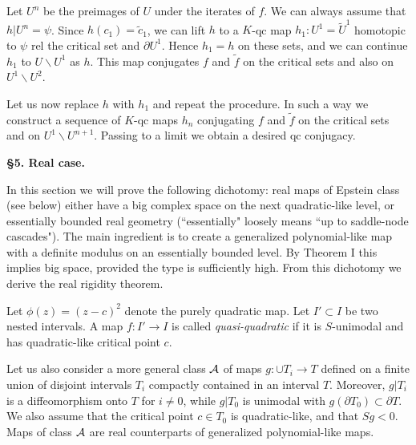 Let $U^n$ be the preimages of $U$ under the iterates of $f$. 
We can always assume 
that $h|U^n=\psi$.  Since $h(c_1)=\tilde c_1$, we can lift $h$ to a $K$-qc map
$h_1: U^1=\tilde U^1$ homotopic to $\psi$ rel the critical set and
$\partial U^1$. Hence $h_1=h$ on these sets, and we can continue $h_1$ to
$U\backslash U^1$ as $h$. This map conjugates $f$ and $\tilde f$ on 
the critical sets and also on $U^1\backslash U^2$.

Let us now replace $h$ with $h_1$ and repeat the procedure. In such a way
we construct a sequence of $K$-qc maps $h_n$ conjugating $f$ and $\tilde f$
on the critical sets and on $U^1\backslash U^{n+1}$. 
Passing to a limit we obtain a desired qc conjugacy.


 






\bigskip\centerline{\bf \S 5. Real case.}\medskip

In this section we will prove the following dichotomy:
 real maps of Epstein class (see below) either have a big complex space 
on the next quadratic-like level, or
essentially  bounded  real geometry (``essentially" loosely means
``up to saddle-node cascades"). The main ingredient is to create 
a generalized polynomial-like map with a definite modulus on an
essentially bounded level. By Theorem I  this implies big space,
provided the type is sufficiently high. From this dichotomy
we derive the real rigidity theorem.


%
 
\medskip{}
Let $\phi(z)=(z-c)^2$ denote the purely quadratic map. Let $I'\subset I$
be two nested intervals. A map 
$f: I'\rightarrow I$ is called {\sl quasi-quadratic} if it is $S$-unimodal
and has quadratic-like critical point $c$.  
 
Let us also consider a more general class ${\cal A}$ of maps  
$g: \cup T_i\rightarrow T$ defined
on a finite union of disjoint intervals $T_i$ compactly contained in an
interval $T$. Moreover, $g|T_i$ is a diffeomorphism onto $T$ for $i\not=0$,
while $g|T_0$ is unimodal with $g(\partial T_0)\subset\partial T$.
We also assume that the critical point $c\in T_0$ is quadratic-like, 
and that $S g<0$.  Maps of class ${\cal A}$ are real counterparts of 
generalized polynomial-like maps.  

